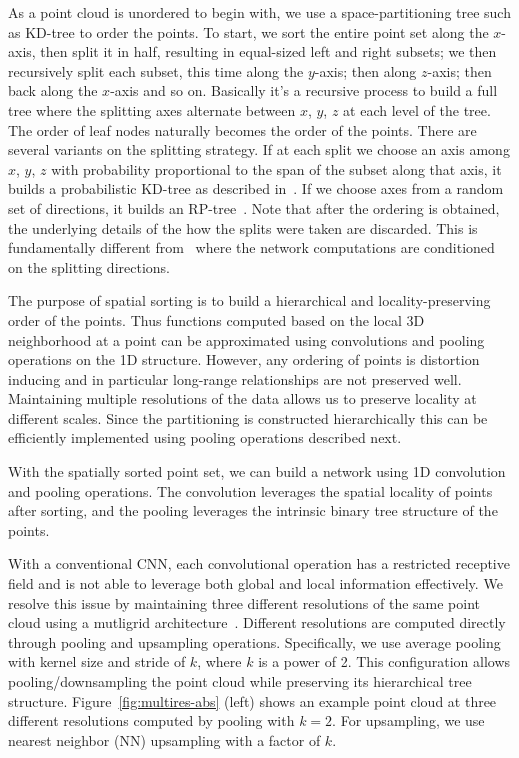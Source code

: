  As a point cloud is unordered to begin with, we use a space-partitioning tree such as KD-tree to order the points. To start, we sort the entire point set along the $x$-axis, then split it in half, resulting in equal-sized left and right subsets; we then recursively split each subset, this time along the $y$-axis; then along $z$-axis; then back along the $x$-axis and so on. Basically it's a recursive process to build a full tree where the splitting axes alternate between $x$, $y$, $z$ at each level of the tree. The order of leaf nodes naturally becomes the order of the points. There are several variants on the splitting strategy. If at each split we choose an axis among $x$, $y$, $z$ with probability proportional to the span of the subset along that axis, it builds a probabilistic KD-tree as described in~\cite{Klokov_2017_ICCV}. If we choose axes from a random set of directions, it builds an RP-tree~\cite{Dasgupta:2008:RPT}.
Note that after the ordering is obtained, the underlying details of the how the splits were taken are discarded.
This is fundamentally different from~\cite{Klokov_2017_ICCV} where the network computations are conditioned on the splitting directions.



The purpose of spatial sorting is to build a hierarchical and locality-preserving order of the points.
Thus functions computed based on the local 3D neighborhood at a point can be approximated using convolutions and pooling operations on the 1D structure.
However, any ordering of points is distortion inducing and in particular long-range relationships are not preserved well.
Maintaining multiple resolutions of the data allows us to preserve locality at different scales.
Since the partitioning is constructed hierarchically this can be efficiently implemented using pooling operations described next.






 With the spatially sorted point set, we can build a network using 1D convolution and pooling operations. The convolution leverages the spatial locality of points after sorting, and the pooling leverages the intrinsic binary tree structure of the points. %



With a conventional CNN, each convolutional operation has a restricted receptive field and is not able to leverage both global and local information effectively. We resolve this issue by maintaining three different resolutions of the same point cloud using a mutligrid architecture~\cite{multigrid}. Different resolutions are computed directly through pooling and upsampling operations. Specifically, we use average pooling with kernel size and stride of $k$, where $k$ is a power of 2. This configuration allows pooling/downsampling the point cloud while preserving its hierarchical tree structure. Figure~\ref{fig:multires-abs} (left) shows an example point cloud at three different resolutions computed by pooling with $k=2$. For upsampling, we use nearest neighbor (NN) upsampling with a factor of $k$.


